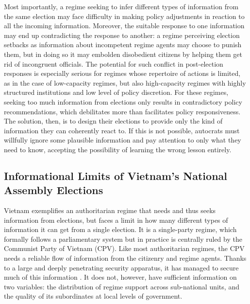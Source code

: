 \documentclass[12pt]{article}
\newcommand{\1}{\mathbbm{1}}
\begin{document}
Most importantly, a regime seeking to infer different types of information from the same election may face difficulty in making policy adjustments in reaction to all the incoming information. Moreover, the suitable response to one information may end up contradicting the response to another: a regime perceiving election setbacks as information about incompetent regime agents may choose to punish them, but in doing so it may embolden disobedient citizens by helping them get rid of incongruent officials. The potential for such conflict in post-election responses is especially serious for regimes whose repertoire of actions is limited, as in the case of low-capacity regimes, but also high-capacity regimes with highly structured institutions and low level of policy discretion. For these regimes, seeking too much information from elections only results in contradictory policy recommendations, which debilitates more than facilitates policy responsiveness. The solution, then, is to design their elections to provide only the kind of information they can coherently react to. If this is not possible, autocrats must willfully ignore some plausible information and pay attention to only what they need to know, accepting the possibility of learning the wrong lesson entirely. 

\subsection*{Informational Limits of Vietnam's National Assembly Elections}
\label{sec:vietnam_limits}
Vietnam exemplifies an authoritarian regime that needs and thus seeks information from elections, but faces a limit in how many different types of information it can get from a single election. It is a single-party regime, which formally follows a parliamentary system but in practice is centrally ruled by the Communist Party of Vietnam (CPV). Like most authoritarian regimes, the CPV needs a reliable flow of information from the citizenry and regime agents. Thanks to a large and deeply penetrating security apparatus, it has managed to secure much of this information \citep[see][]{Thayer2014}. It does not, however, have sufficient information on two variables: the distribution of regime support across sub-national units, and the quality of its subordinates at local levels of government. 
\end{document}
